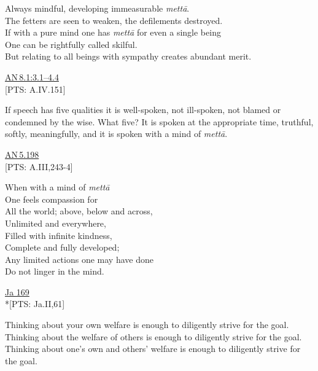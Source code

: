 \documentclass[10pt, openright]{book}
\begin{document}
\begin{itemize}


Always mindful, developing immeasurable \textit{mettā}. \\ 
The fetters are seen to weaken, the defilements destroyed. \\ 
If with a pure mind one has \textit{mettā} for even a single being \\ 
One can be rightfully called skilful. \\ 
But relating to all beings with sympathy creates abundant merit.


\end{itemize}
\begin{flushright}
\href{https://suttacentral.net/an8.1/en/sujato\#3.1}{AN 8.1:3.1–4.4}\\

[PTS: A.IV.151]


\end{flushright}
If speech has five qualities it is well-spoken, not ill-spoken, not blamed or condemned by the wise. What five? It is spoken at the appropriate time, truthful, softly, meaningfully, and it is spoken with a mind of \textit{mettā}.


\begin{flushright}
\href{https://suttacentral.net/an5.198/en/sujato}{AN 5.198}\\

[PTS: A.III,243-4]


\end{flushright}


\begin{itemize}


When with a mind of \textit{mettā} \\ 
One feels compassion for \\ 
All the world; above, below and across, \\ 
Unlimited and everywhere, \\ 
Filled with infinite kindness, \\ 
Complete and fully developed; \\ 
Any limited actions one may have done \\ 
Do not linger in the mind.


\end{itemize}
\begin{flushright}
\href{https://suttacentral.net/ja169/en/rouse}{Ja 169}\\

*[PTS: Ja.II,61]


\end{flushright}
Thinking about your own welfare is enough to diligently strive for the goal. Thinking about the welfare of others is enough to diligently strive for the goal. Thinking about one’s own and others’ welfare is enough to diligently strive for the goal.
\end{document}
